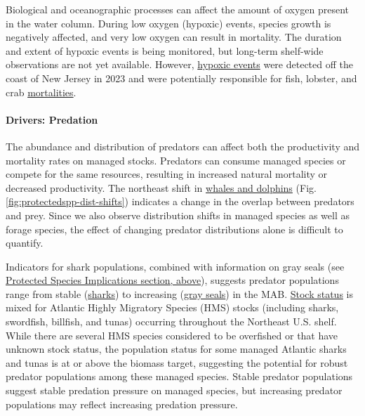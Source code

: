 \documentclass[
  10pt,
]{article}
\begin{document}
Biological and oceanographic processes can affect the amount of oxygen present in the water column. During low oxygen (hypoxic) events, species growth is negatively affected, and very low oxygen can result in mortality. The duration and extent of hypoxic events is being monitored, but long-term shelf-wide observations are not yet available. However, \href{https://noaa-edab.github.io/catalog/ocean_acidification.html}{hypoxic events} were detected off the coast of New Jersey in 2023 and were potentially responsible for fish, lobster, and crab \href{https://sebsnjaesnews.rutgers.edu/2023/12/rutgers-scientists-observe-unusual-ocean-conditions-possibly-linked-to-mortality-in-marine-life-off-new-jersey/}{mortalities}.

\hypertarget{drivers-predation}{%
\paragraph{Drivers: Predation}\label{drivers-predation}}

The abundance and distribution of predators can affect both the productivity and mortality rates on managed stocks. Predators can consume managed species or compete for the same resources, resulting in increased natural mortality or decreased productivity. The northeast shift in \href{https://noaa-edab.github.io/catalog/HMS_species_distribution.html}{whales and dolphins} (Fig. \ref{fig:protectedspp-dist-shifts}) indicates a change in the overlap between predators and prey. Since we also observe distribution shifts in managed species as well as forage species, the effect of changing predator distributions alone is difficult to quantify.

Indicators for shark populations, combined with information on gray seals (see \protect\hyperlink{protected-species}{Protected Species Implications section, above}), suggests predator populations range from stable (\href{https://noaa-edab.github.io/catalog/hms_cpue.html}{sharks}) to increasing (\href{https://noaa-edab.github.io/catalog/seal_pups.html}{gray seals}) in the MAB. \href{https://noaa-edab.github.io/catalog/hms_stock_status.html}{Stock status} is mixed for Atlantic Highly Migratory Species (HMS) stocks (including sharks, swordfish, billfish, and tunas) occurring throughout the Northeast U.S. shelf. While there are several HMS species considered to be overfished or that have unknown stock status, the population status for some managed Atlantic sharks and tunas is at or above the biomass target, suggesting the potential for robust predator populations among these managed species. Stable predator populations suggest stable predation pressure on managed species, but increasing predator populations may reflect increasing predation pressure.
\end{document}
